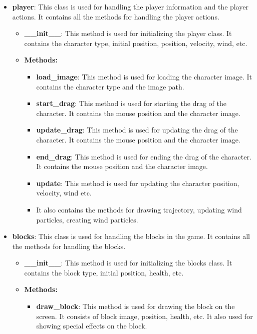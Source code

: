 \documentclass[12pt]{article}
\begin{document}
\begin{itemize}
    \item \textbf{player}: This class is used for handling the player information and the player actions. It contains all the methods for handling the player actions.    
        \begin{itemize}
            \item \textbf{\_\_init\_\_}: This method is used for initializing the player class. It contains the character type, initial position, position, velocity, wind, etc.
            \item \textbf{Methods:}
                \begin{itemize}
                    \item \textbf{load\_image}: This method is used for loading the character image. It contains the character type and the image path.
                    \item \textbf{start\_drag}: This method is used for starting the drag of the character. It contains the mouse position and the character image.
                    \item \textbf{update\_drag}: This method is used for updating the drag of the character. It contains the mouse position and the character image.
                    \item \textbf{end\_drag}: This method is used for ending the drag of the character. It contains the mouse position and the character image.
                    \item \textbf{update}: This method is used for updating the character position, velocity, wind etc.
                    \item It also contains the methods for drawing trajectory, updating wind particles, creating wind particles.
                \end{itemize}
        \end{itemize}
    \item \textbf{blocks}: This class is used for handling the blocks in the game. It contains all the methods for handling the blocks.
        \begin{itemize}
            \item \textbf{\_\_init\_\_}: This method is used for initializing the blocks class. It contains the block type, initial position, health, etc.
            \item \textbf{Methods:}
                \begin{itemize}
                    \item \textbf{draw\_block}: This method is used for drawing the block on the screen. It consists of block image, position, health, etc. It also used for showing special effects on the block.

\end{itemize}
\end{itemize}
\end{itemize}
\end{document}
